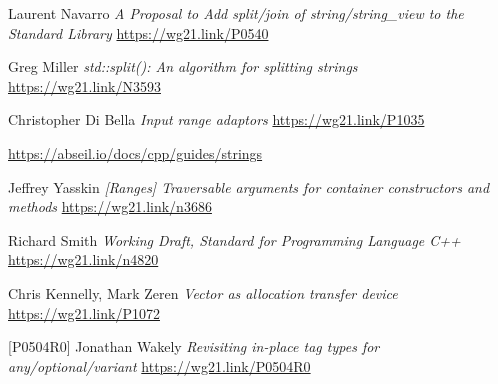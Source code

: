 \documentclass{wg21}
\begin{document}
\begin{thebibliography}{9}
    Laurent Navarro
    \emph{A Proposal to Add split/join of string/string_view to the Standard Library}\newline
    \url{https://wg21.link/P0540}

    Greg Miller
    \emph{std::split(): An algorithm for splitting strings}\newline
    \url{https://wg21.link/N3593}

    Christopher Di Bella
    \emph{Input range adaptors}\newline
    \url{https://wg21.link/P1035}

    \url{https://abseil.io/docs/cpp/guides/strings}

    Jeffrey Yasskin
    \emph{[Ranges] Traversable arguments for container constructors and methods}\newline
    \url{https://wg21.link/n3686}
    
    Richard Smith
    \emph{Working Draft, Standard for Programming Language C++}\newline
    \url{https://wg21.link/n4820}

	Chris Kennelly, Mark Zeren
	\emph{Vector as allocation transfer device}
	\url{https://wg21.link/P1072}

[P0504R0]
	Jonathan Wakely
	\emph{Revisiting in-place tag types for any/optional/variant}
	\url{https://wg21.link/P0504R0}


\end{thebibliography}
\end{document}
